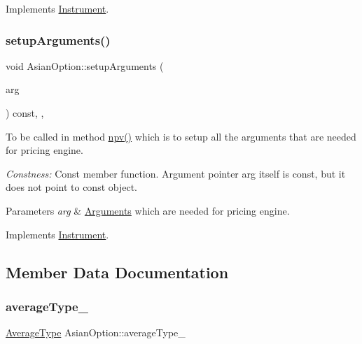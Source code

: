 Implements \hyperlink{class_instrument_a381f093402f789ad7c0ffecd233167dc}{Instrument}.

\hypertarget{class_asian_option_a82c9b5fb3bea69f476a65e9675e1cc28}{}\label{class_asian_option_a82c9b5fb3bea69f476a65e9675e1cc28} 
\subsubsection{\texorpdfstring{setup\+Arguments()}{setupArguments()}}
{\footnotesize\ttfamily void Asian\+Option\+::setup\+Arguments (\begin{DoxyParamCaption}\item[{\hyperlink{class_pricing_engine_1_1_arguments}{Pricing\+Engine\+::\+Arguments} $\ast$const}]{arg }\end{DoxyParamCaption}) const\hspace{0.3cm}{\ttfamily [override]}, {\ttfamily [private]}, {\ttfamily [virtual]}}



To be called in method \hyperlink{class_instrument_aa750f2ae95a21d65a073da3171e8d084}{npv()} which is to setup all the arguments that are needed for pricing engine. 

{\itshape Constness\+:} Const member function. Argument pointer arg itself is const, but it does not point to const object. 
\begin{DoxyParams}{Parameters}
{\em arg} & \hyperlink{class_asian_option_1_1_arguments}{Arguments} which are needed for pricing engine. \\
\hline
\end{DoxyParams}


Implements \hyperlink{class_instrument_a5cd384be384fe415f09ecc78e2a87539}{Instrument}.



\subsection{Member Data Documentation}
\hypertarget{class_asian_option_a602d4f41bc033a8242a0641cf5104045}{}\label{class_asian_option_a602d4f41bc033a8242a0641cf5104045} 
\subsubsection{\texorpdfstring{average\+Type\+\_\+}{averageType\_}}
{\footnotesize\ttfamily \hyperlink{class_asian_option_add7292791bf85820ff9fdbfd4407f3b9}{Average\+Type} Asian\+Option\+::average\+Type\+\_\+\hspace{0.3cm}{\ttfamily [private]}}



